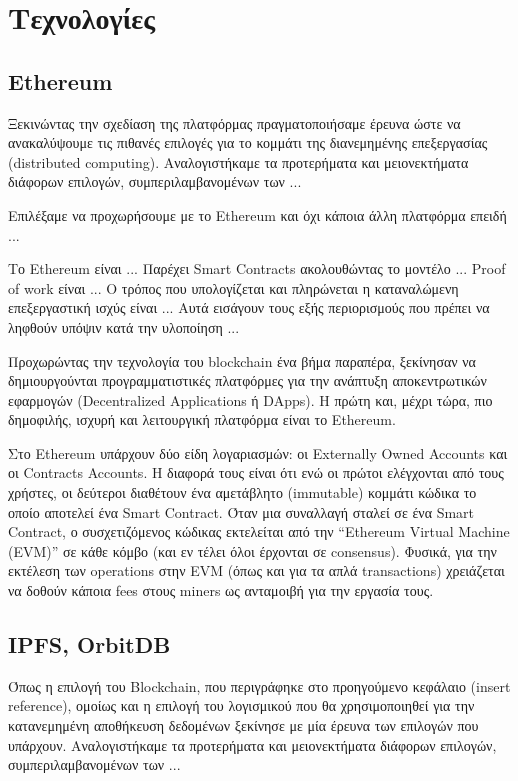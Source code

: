 \section{Τεχνολογίες}

\subsection{Ethereum}

Ξεκινώντας την σχεδίαση της πλατφόρμας πραγματοποιήσαμε έρευνα ώστε να ανακαλύψουμε τις πιθανές επιλογές για το κομμάτι της διανεμημένης επεξεργασίας (\textenglish{distributed computing}). Αναλογιστήκαμε τα προτερήματα και μειονεκτήματα διάφορων επιλογών, συμπεριλαμβανομένων των ... 

Επιλέξαμε να προχωρήσουμε με το Ethereum και όχι κάποια άλλη πλατφόρμα επειδή ...

Το Ethereum είναι ...
Παρέχει Smart Contracts ακολουθώντας το μοντέλο ...
Proof of work είναι ...
Ο τρόπος που υπολογίζεται και πληρώνεται η καταναλώμενη επεξεργαστική ισχύς είναι ...
Αυτά εισάγουν τους εξής περιορισμούς που πρέπει να ληφθούν υπόψιν κατά την υλοποίηση ...

Προχωρώντας την τεχνολογία του blockchain ένα βήμα παραπέρα, ξεκίνησαν να δημιουργούνται προγραμματιστικές πλατφόρμες για την ανάπτυξη αποκεντρωτικών εφαρμογών (\textenglish{Decentralized Applications} ή DApps). Η πρώτη και, μέχρι τώρα, πιο δημοφιλής, ισχυρή και λειτουργική πλατφόρμα είναι το Ethereum.

Στο Ethereum υπάρχουν δύο είδη λογαριασμών: οι Externally Owned Accounts και οι \textenglish{Contracts Accounts}. Η διαφορά τους είναι ότι ενώ οι πρώτοι ελέγχονται από τους χρήστες, οι δεύτεροι διαθέτουν ένα αμετάβλητο (immutable) κομμάτι κώδικα το οποίο αποτελεί ένα \textenglish{Smart Contract}. Όταν μια συναλλαγή σταλεί σε ένα Smart Contract, ο συσχετιζόμενος κώδικας εκτελείται από την  “Ethereum Virtual Machine (EVM)” σε κάθε κόμβο (και εν τέλει όλοι έρχονται σε consensus). Φυσικά, για την εκτέλεση των operations στην EVM (όπως και για τα απλά \textenglish{transactions}) χρειάζεται να δοθούν κάποια fees στους miners ως ανταμοιβή για την εργασία τους.


\subsection{IPFS, OrbitDB}

Όπως η επιλογή του Blockchain, που περιγράφηκε στο προηγούμενο κεφάλαιο (\textenglish{insert reference}), ομοίως και η επιλογή του λογισμικού που θα χρησιμοποιηθεί για την κατανεμημένη αποθήκευση δεδομένων ξεκίνησε με μία έρευνα των επιλογών που υπάρχουν. Αναλογιστήκαμε τα προτερήματα και μειονεκτήματα διάφορων επιλογών, συμπεριλαμβανομένων των ... 

